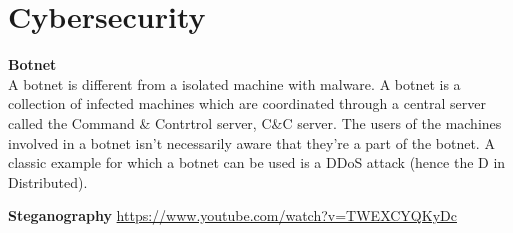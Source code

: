 \section{Cybersecurity}

\textbf{Botnet}   \cite{cybersecurity:botnets} \\
A botnet is different from a isolated machine with malware. A botnet is a collection of infected machines which are coordinated through a central server called the Command \& Contrtrol server, C\&C server. The users of the machines involved in a botnet isn't necessarily aware that they're a part of the botnet.  A classic example for which a botnet can be used is a DDoS attack (hence the D in Distributed).  

\textbf{Steganography} \url{https://www.youtube.com/watch?v=TWEXCYQKyDc} 



